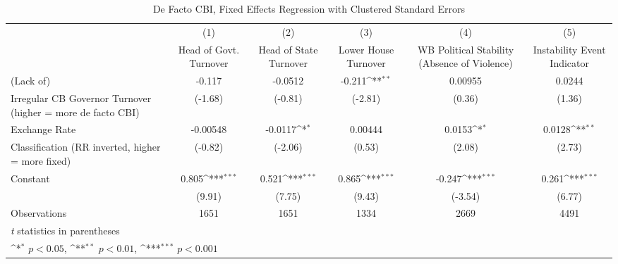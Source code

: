 \begin{table}[htbp]\centering
\def\sym#1{\ifmmode^{#1}\else\(^{#1}\)\fi}
\caption{De Facto CBI, Fixed Effects Regression with Clustered Standard Errors \label{multIndFEDF}}
\begin{tabular}{l*{5}{c}}
\toprule
                &\multicolumn{1}{c}{(1)}&\multicolumn{1}{c}{(2)}&\multicolumn{1}{c}{(3)}&\multicolumn{1}{c}{(4)}&\multicolumn{1}{c}{(5)}\\
                &\multicolumn{1}{c}{Head of Govt. Turnover}&\multicolumn{1}{c}{Head of State Turnover}&\multicolumn{1}{c}{Lower House Turnover}&\multicolumn{1}{c}{WB Political Stability (Absence of Violence)}&\multicolumn{1}{c}{Instability Event Indicator}\\
\midrule
(Lack of)       &   -0.117         &  -0.0512         &   -0.211\sym{**} &  0.00955         &   0.0244         \\
Irregular CB Governor Turnover (higher = more de facto CBI)&  (-1.68)         &  (-0.81)         &  (-2.81)         &   (0.36)         &   (1.36)         \\
\addlinespace
Exchange Rate   & -0.00548         &  -0.0117\sym{*}  &  0.00444         &   0.0153\sym{*}  &   0.0128\sym{**} \\
Classification (RR inverted, higher = more fixed)&  (-0.82)         &  (-2.06)         &   (0.53)         &   (2.08)         &   (2.73)         \\
\addlinespace
Constant        &    0.805\sym{***}&    0.521\sym{***}&    0.865\sym{***}&   -0.247\sym{***}&    0.261\sym{***}\\
                &   (9.91)         &   (7.75)         &   (9.43)         &  (-3.54)         &   (6.77)         \\
\midrule
Observations    &     1651         &     1651         &     1334         &     2669         &     4491         \\
\bottomrule
\multicolumn{6}{l}{\footnotesize \textit{t} statistics in parentheses}\\
\multicolumn{6}{l}{\footnotesize \sym{*} \(p<0.05\), \sym{**} \(p<0.01\), \sym{***} \(p<0.001\)}\\
\end{tabular}
\end{table}
